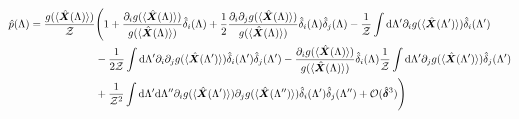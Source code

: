\documentclass[%
 reprint,
 amsmath,amssymb,
 aps,nofootinbib,nobibnotes,onecolumn,prd
]{revtex4-2}
\begin{document}
\begin{align}
\hat{p}(\Lambda) = \frac{
g(\langle \hat{\bm X}(\Lambda)\rangle)
}{
\mathcal{Z}
}
&\Bigg(
1 
+ 
\frac{\partial_ig(\langle \hat{\bm X}(\Lambda)\rangle)}{g(\langle \hat{\bm X}(\Lambda)\rangle)}\hat{\delta}_i(\Lambda)
+ 
\frac{1}{2}\frac{\partial_i\partial_jg(\langle \hat{\bm X}(\Lambda)\rangle)}{g(\langle \hat{\bm X}(\Lambda)\rangle)}\hat{\delta}_i(\Lambda)\hat{\delta}_j(\Lambda)
-
\frac{1}{\mathcal{Z}}\int {\rm d}\Lambda'\partial_ig(\langle \hat{\bm X}(\Lambda')\rangle)\hat{\delta}_i(\Lambda') \nonumber \\
&- \frac{1}{2\mathcal{Z}}\int {\rm d}\Lambda' \partial_i\partial_jg(\langle \hat{\bm X}(\Lambda')\rangle)\hat{\delta}_i(\Lambda')\hat{\delta}_j(\Lambda')
-
\frac{\partial_ig(\langle \hat{\bm X}(\Lambda)\rangle)}{g(\langle \hat{\bm X}(\Lambda)\rangle)}\hat{\delta}_i(\Lambda) \frac{1}{\mathcal{Z}}\int {\rm d}\Lambda'\partial_jg(\langle \hat{\bm X}(\Lambda')\rangle)\hat{\delta}_j(\Lambda')
\nonumber \\ 
&+
\frac{1}{\mathcal{Z}^2}\int {\rm d}\Lambda' {\rm d}\Lambda''\partial_ig(\langle \hat{\bm X}(\Lambda')\rangle)\partial_jg(\langle \hat{\bm X}(\Lambda'')\rangle)\hat{\delta}_i(\Lambda')\hat{\delta}_j(\Lambda'') + \mathcal{O}(\hat{\bm \delta}^3)\Bigg)
\end{align}
\end{document}
